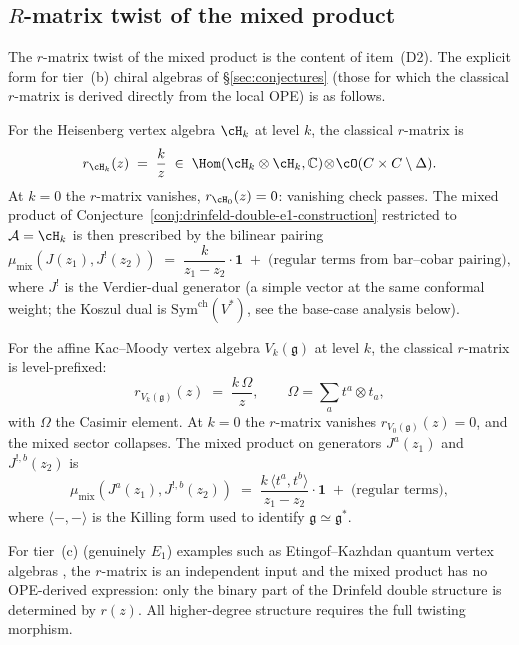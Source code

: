 \subsection{$R$-matrix twist of the mixed product}
\label{subsec:drinfeld-e1-twist}

The $r$-matrix twist of the mixed product is the content of
item~(D2). The explicit form for tier~(b) chiral
algebras of \S\ref{sec:conjectures} (those for which the
classical $r$-matrix is derived directly from the local OPE)
is as follows.

For the Heisenberg vertex algebra $\cH_k$ at level $k$, the
classical $r$-matrix is
\begin{equation}
\label{eq:drinfeld-r-heisenberg}
r_{\cH_k}(z)
\;=\;
\frac{k}{z}\;\in\;\Hom(\cH_k\otimes\cH_k,\mathbb{C})\!\otimes\!\cO(C\times C \setminus \Delta).
\end{equation}
At $k = 0$ the $r$-matrix vanishes, $r_{\cH_0}(z) = 0$:
vanishing check passes. The mixed product of
Conjecture~\ref{conj:drinfeld-double-e1-construction}
restricted to $\cA = \cH_k$ is then prescribed by the
bilinear pairing
\begin{equation}
\label{eq:drinfeld-mix-heisenberg}
\mu_{\mathrm{mix}}(J(z_1),J^!(z_2))
\;=\;
\frac{k}{z_1-z_2}\cdot \mathbf 1
\;+\;\text{(regular terms from bar--cobar pairing)},
\end{equation}
where $J^!$ is the Verdier-dual generator (a simple vector
at the same conformal weight; the Koszul dual is
$\mathrm{Sym}^{\mathrm{ch}}(V^*)$, see the base-case analysis below).

For the affine Kac--Moody vertex algebra $V_k(\mathfrak g)$
at level $k$, the classical $r$-matrix is level-prefixed:
\begin{equation}
\label{eq:drinfeld-r-kmc}
r_{V_k(\mathfrak g)}(z) \;=\;\frac{k\,\Omega}{z},
\qquad
\Omega = \sum_a t^a\otimes t_a,
\end{equation}
with $\Omega$ the Casimir element. At $k=0$ the $r$-matrix
vanishes $r_{V_0(\mathfrak g)}(z) = 0$, and the mixed
sector collapses. The mixed
product on generators $J^a(z_1)$ and $J^{!,b}(z_2)$ is
\begin{equation}
\label{eq:drinfeld-mix-kmc}
\mu_{\mathrm{mix}}(J^a(z_1), J^{!,b}(z_2))
\;=\;
\frac{k\,\langle t^a,t^b\rangle}{z_1 - z_2}\cdot\mathbf 1
\;+\;\text{(regular terms)},
\end{equation}
where $\langle-,-\rangle$ is the Killing form used to
identify $\mathfrak g\simeq\mathfrak g^*$.

For tier~(c) (genuinely $E_1$) examples such as
Etingof--Kazhdan quantum vertex algebras
\cite{etingof1996quantization}, the $r$-matrix is an
independent input and the mixed product has no OPE-derived
expression: only the binary part of the Drinfeld double
structure is determined by $r(z)$. All higher-degree
structure requires the full twisting morphism.


